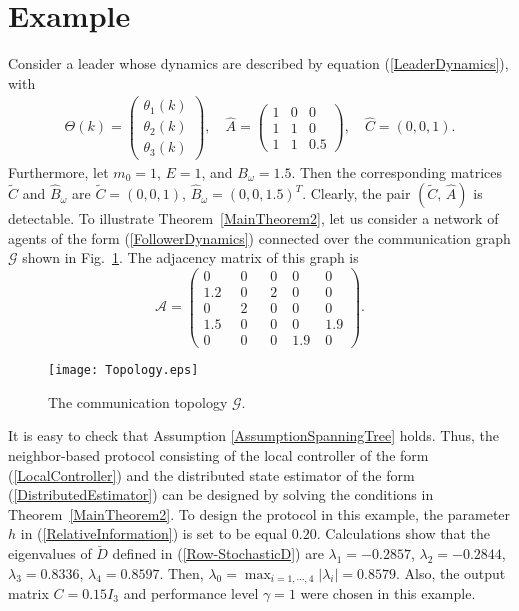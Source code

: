 \documentclass[a4paper,10pt,onecolumn]{article}
\begin{document}
\section{Example}
Consider a leader whose dynamics are described by equation
(\ref{LeaderDynamics}), with
\begin{align*}\label{SimulationLeader}
\Theta(k)=\left(\!\!\begin{array}{c}
\theta_{1}(k)\\
\theta_{2}(k)\\
\theta_{3}(k)
\end{array}\!\!\right), \quad \hat{A}=\left(\!\!\begin{array}{ccc}
1&0&0\\
1&1&0\\
1&1&0.5
\end{array}\!\!\right),\quad \hat{C}=(0,0,1).
\end{align*}
Furthermore, let $m_{0}=1$, $E=1$, and $B_{\omega}=1.5$. Then the
corresponding matrices $\tilde{C}$ and $\hat{B}_{\omega}$ are
$\tilde{C}=(0,0,1)$, $\hat{B}_{\omega}=(0,0,1.5)^{T}$. Clearly, the pair $(\tilde{C},\,\hat{A})$ is detectable.  To illustrate
Theorem~\ref{MainTheorem2}, let us consider a network of agents of the form
(\ref{FollowerDynamics}) connected over the
communication graph $\mathcal{G}$ shown in Fig.~\ref{fig1}. The adjacency matrix of this graph is
\begin{equation*}\label{SimulationAdjacencyMatrix}
\mathcal{A}=\left(\begin{array}{cccccc}
0\;\;  &0\;\;\;&0\;&0\;&0\\
1.2\;\;&0\;\;\;&2\;&0\;&0\\
0\;\;  &2\;\;\;&0\;&0\;&0\\
1.5\;\;&0\;\;\;&0\;&0\;&{1.9}\\
0\;\;  &0\;\;\;&0\;&{1.9}\;&0
\end{array}\right).
\end{equation*}


   \begin{figure}[thpb]
      \centering
      \texttt{[image: Topology.eps]}
      \caption{The communication topology $\mathcal{G}$.}
      \label{fig1}
   \end{figure}
It is easy to check that Assumption \ref{AssumptionSpanningTree}
holds. Thus, the neighbor-based protocol consisting of the local controller 
of the form (\ref{LocalController}) and the distributed state estimator of the form (\ref{DistributedEstimator}) can be
 designed by solving the conditions in Theorem~\ref{MainTheorem2}.
 To design the protocol in this example, the parameter $h$ in
 (\ref{RelativeInformation}) is set
 to be equal $0.20$. Calculations show that the eigenvalues of $\breve{D}$
 defined in (\ref{Row-StochasticD}) are $\lambda_{1}=-0.2857$,
 $\lambda_{2}= -0.2844$, $\lambda_{3}=  0.8336$,
 $\lambda_{4}=  0.8597$. Then,
 $\lambda_{0}=\max_{i=1,\cdots,4}|\lambda_{i}|=0.8579$. Also,
 the output matrix $C=0.15I_{3}$ and performance level $\gamma=1$ were
 chosen in this example.
\end{document}
